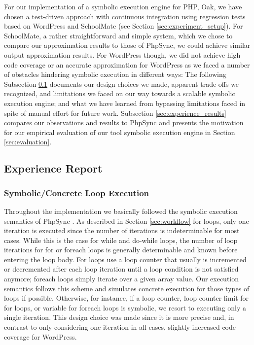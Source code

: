 \documentclass[sigconf]{acmart}
\renewcommand{\sf}[1]{\textsf{#1}}
\begin{document}
For our implementation of a symbolic execution engine for PHP, Oak, we have
chosen a test-driven approach with continuous integration using regression
tests based on \sf{WordPress} and \sf{SchoolMate} (see Section
\ref{sec:experiment_setup}). For \sf{SchoolMate}, a rather straightforward and
simple system, which we chose to compare our approximation results to those of
\sf{PhpSync}, we could achieve similar output approximation results. For
\sf{WordPress} though, we did not achieve high code coverage or an accurate
approximation for \sf{WordPress} as we faced a number of obstacles hindering
symbolic execution in different ways: The following Subsection
\ref{sec:experience_report} documents our design choices we made, apparent trade-offs we recognized, and limitations
we faced on our way towards a scalable symbolic execution engine; and what we
have learned from bypassing limitations faced in spite of manual effort for
future work. Subsection \ref{sec:experience_results} compares our observations
and results to \sf{PhpSync} and presents the motivation for our empirical
evaluation of our tool symbolic execution engine in Section \ref{sec:evaluation}.



\subsection{Experience Report}\label{sec:experience_report}

\subsubsection{Symbolic/Concrete Loop Execution}
Throughout the implementation we basically followed the symbolic execution
semantics of \sf{PhpSync} \cite{Nguyen:2014:BCG:2635868.2635928}. As described
in Section \ref{sec:workflow} for loops, only one iteration is executed since
the number of iterations is indeterminable for most cases. While this is the
case for while and do-while loops, the number of loop iterations for for or
foreach loops is generally determinable and known before entering the loop
body. For loops use a loop counter that usually is incremented or decremented
after each loop iteration until a loop condition is not satisfied anymore;
foreach loops simply iterate over a given array value.
Our execution semantics follows this scheme and simulates concrete execution
for those types of loops if possible. Otherwise, for instance, if a loop
counter, loop counter limit for for loops, or variable for foreach loops is
symbolic, we resort to executing only a single iteration. This design choice
was made since it is more precise and, in contrast to only considering one
iteration in all cases, slightly increased code coverage for \sf{WordPress}.
\end{document}
